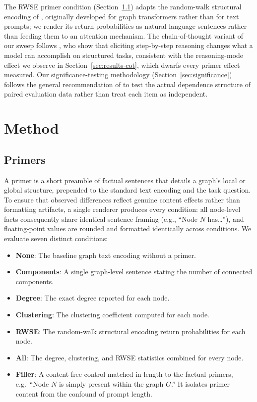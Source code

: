 \documentclass[11pt]{article}
\begin{document}
The RWSE primer condition (Section~\ref{sec:primers}) adapts the
random-walk structural encoding of \citet{dwivedi2022graph}, originally
developed for graph transformers rather than for text prompts; we render
its return probabilities as natural-language sentences rather than feeding
them to an attention mechanism. The chain-of-thought variant of our sweep
follows \citet{wei2022chainofthought}, who show that eliciting
step-by-step reasoning changes what a model can accomplish on structured
tasks, consistent with the reasoning-mode effect we observe in
Section~\ref{sec:results-cot}, which dwarfs every primer effect measured.
Our significance-testing methodology (Section~\ref{sec:significance})
follows the general recommendation of \citet{dror2018hitchhikers} to test
the actual dependence structure of paired evaluation data rather than treat
each item as independent.

\section{Method}
\label{sec:method}

\subsection{Primers}
\label{sec:primers}

A primer is a short preamble of factual sentences that details a graph's
local or global structure, prepended to the standard text encoding and the
task question. To ensure that observed differences reflect genuine content
effects rather than formatting artifacts, a single renderer produces every
condition: all node-level facts consequently share identical sentence
framing (e.g., ``Node $N$ has\dots''), and floating-point values are rounded
and formatted identically across conditions. We evaluate seven distinct
conditions:
\begin{itemize}
    \item \textbf{None}: The baseline graph text encoding without a
    primer.
    \item \textbf{Components}: A single graph-level sentence stating the
    number of connected components.
    \item \textbf{Degree}: The exact degree reported for each node.
    \item \textbf{Clustering}: The clustering coefficient computed for
    each node.
    \item \textbf{RWSE}: The random-walk structural encoding
    \citep{dwivedi2022graph} return probabilities for each node.
    \item \textbf{All}: The degree, clustering, and RWSE statistics
    combined for every node.
    \item \textbf{Filler}: A content-free control matched in length to the
    factual primers, e.g.\ ``Node $N$ is simply present within the graph
    $G$.'' It isolates primer content from the confound of prompt length.
\end{itemize}
\end{document}

